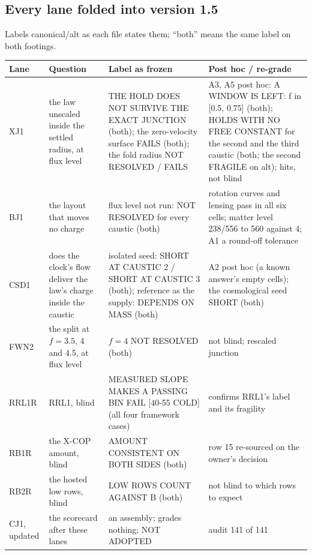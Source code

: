 \documentclass[10pt]{article}
\begin{document}
\subsection{Every lane folded into version 1.5}
Labels canonical/alt as each file states them; ``both'' means the same label on both footings.
{\footnotesize
\begin{longtable}{@{}p{1.6cm}p{3.8cm}p{5.6cm}p{4.7cm}@{}}\toprule
Lane & Question & Label as frozen & Post hoc / re-grade\\\midrule\endhead
XJ1 & the law unscaled inside the settled radius, at flux level & THE HOLD DOES NOT SURVIVE THE EXACT JUNCTION (both); the zero-velocity surface FAILS (both); the fold radius NOT RESOLVED / FAILS & A3, A5 post hoc: A WINDOW IS LEFT: f in [0.5, 0.75] (both); HOLDS WITH NO FREE CONSTANT for the second and the third caustic (both; the second FRAGILE on alt); hits, not blind\\
BJ1 & the layout that moves no charge & flux level not run: NOT RESOLVED for every caustic (both) & rotation curves and lensing pass in all six cells; matter level 238/556 to 560 against 4; A1 a round-off tolerance\\
CSD1 & does the clock's flow deliver the law's charge inside the caustic & isolated seed: SHORT AT CAUSTIC 2 / SHORT AT CAUSTIC 3 (both); reference as the supply: DEPENDS ON MASS (both) & A2 post hoc (a known answer's empty cells); the cosmological seed SHORT (both)\\
FWN2 & the split at $f=3.5$, 4 and 4.5, at flux level & $f=4$ NOT RESOLVED (both) & not blind; rescaled junction\\
RRL1R & RRL1, blind & MEASURED SLOPE MAKES A PASSING BIN FAIL [40-55 COLD] (all four framework cases) & confirms RRL1's label and its fragility\\
RB1R & the X-COP amount, blind & AMOUNT CONSISTENT ON BOTH SIDES (both) & row 15 re-sourced on the owner's decision\\
RB2R & the hosted low rows, blind & LOW ROWS COUNT AGAINST B (both) & not blind to which rows to expect\\
CJ1, updated & the scorecard after these lanes & an assembly; grades nothing; NOT ADOPTED & audit 141 of 141\\\bottomrule
\end{longtable}}
\end{document}

